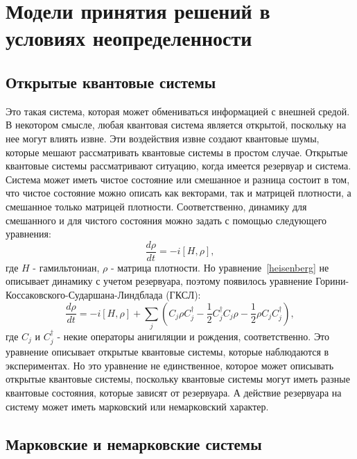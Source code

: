 \chapter{Модели принятия решений в условиях неопределенности}
\section{Открытые квантовые системы}

Это такая система, которая может обмениваться информацией с внешней средой.
В некотором смысле, любая квантовая система является открытой, поскольку на нее могут влиять извне.
Эти воздействия извне создают квантовые шумы, которые мешают рассматривать квантовые системы в простом случае.
Открытые квантовые системы рассматривают ситуацию, когда имеется резервуар и система.
Система может иметь чистое состояние или смешанное и разница состоит в том, что чистое состояние можно
описать как векторами, так и матрицей плотности, а смешанное только матрицей плотности.
Соответственно, динамику для смешанного и для чистого состояния можно задать с помощью следующего уравнения:
\begin{equation}\label{heisenberg}
    \frac{d \rho}{dt} = -i[H,\rho],
\end{equation}
где $H$ - гамильтониан, $\rho$ - матрица плотности.
Но уравнение~\eqref{heisenberg} не описывает динамику с учетом резервуара, поэтому появилось уравнение
Горини-Коссаковского-Сударшана-Линдблада (ГКСЛ):
\begin{equation}
    \frac{d \rho}{dt} = -i[H,\rho] +
    \sum_{j} (C_{j}\rho C^{\dagger}_{j} - \frac{1}{2} C^{\dagger}_{j} C_{j} \rho - \frac{1}{2} \rho C_{j} C^{\dagger}_{j}),
\end{equation}
где $C_{j}$ и $C^{\dagger}_{j}$ - некие операторы анигиляции и рождения, соответственно.
Это уравнение описывает открытые квантовые системы, которые наблюдаются в экспериментах.
Но это уравнение не единственное, которое может описывать открытые квантовые системы, поскольку
квантовые системы могут иметь разные квантовые состояния, которые зависят от резервуара.
А действие резервуара на систему может иметь марковский или немарковский характер.

\section{Марковские и немарковские системы}

